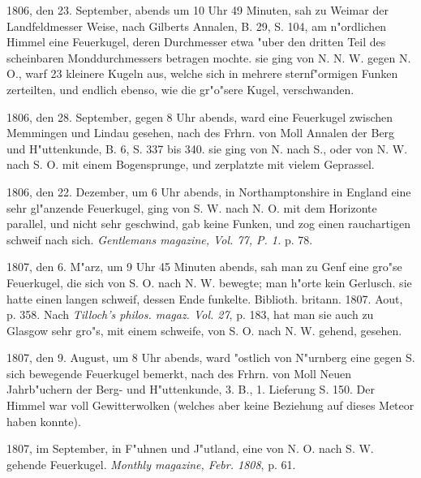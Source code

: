 \documentclass[a4paper, 11pt, oneside, polutonikogreek, german]{article}
\begin{document}
1806, den 23. September, abends um 10 Uhr 49 Minuten, sah zu Weimar der Landfeldmesser Weise, nach Gilberts Annalen, B. 29, S. 104, am n"ordlichen Himmel eine Feuerkugel, deren Durchmesser etwa "uber den dritten Teil des scheinbaren Monddurchmessers betragen mochte. sie ging von N. N. W. gegen N. O., warf 23 kleinere Kugeln aus, welche sich in mehrere sternf"ormigen Funken zerteilten, und endlich ebenso, wie die gr"o"sere Kugel, verschwanden.

1806, den 28. September, gegen 8 Uhr abends, ward eine Feuerkugel zwischen Memmingen und Lindau gesehen, nach des Frhrn. von Moll Annalen der Berg und H"uttenkunde, B. 6, S. 337 bis 340. sie ging von N. nach S., oder von N. W. nach S. O. mit einem Bogensprunge, und zerplatzte mit vielem Geprassel.

1806, den 22. Dezember, um 6 Uhr abends, in Northamptonshire in England eine sehr gl"anzende Feuerkugel, ging von S. W. nach N. O. mit dem Horizonte parallel, und nicht sehr geschwind, gab keine Funken, und zog einen rauchartigen schweif nach sich. \emph{Gentlemans magazine, Vol. 77, P. 1.} p. 78.

1807, den 6. M"arz, um 9 Uhr 45 Minuten abends, sah man zu Genf eine gro"se Feuerkugel, die sich von S. O. nach N. W. bewegte; man h"orte kein Gerlusch. sie hatte einen langen schweif, dessen Ende funkelte. Biblioth. britann. 1807. Aout, p. 358. Nach \emph{Tilloch's philos. magaz. Vol. 27}, p. 183, hat man sie auch zu Glasgow sehr gro"s, mit einem schweife, von S. O. nach N. W. gehend, gesehen.

1807, den 9. August, um 8 Uhr abends, ward "ostlich von N"urnberg eine gegen S. sich bewegende Feuerkugel bemerkt, nach des Frhrn. von Moll Neuen Jahrb"uchern der Berg- und H"uttenkunde, 3. B., 1. Lieferung S. 150. Der Himmel war voll Gewitterwolken (welches aber keine Beziehung auf dieses Meteor haben konnte).

1807, im September, in F"uhnen und J"utland, eine von N. O. nach S. W. gehende Feuerkugel. \emph{Monthly magazine, Febr. 1808}, p. 61.
\end{document}
